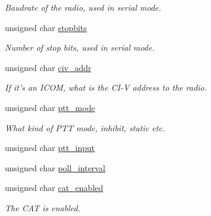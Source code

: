 \begin{CompactItemize}
\begin{CompactList}\small\item\em Baudrate of the radio, used in serial mode. \item\end{CompactList}\item 
\hypertarget{structstruct__radio__settings_5d4d1cea2c84848f17837787af04a467}{
unsigned char \hyperlink{structstruct__radio__settings_5d4d1cea2c84848f17837787af04a467}{stopbits}}
\label{structstruct__radio__settings_5d4d1cea2c84848f17837787af04a467}

\begin{CompactList}\small\item\em Number of stop bits, used in serial mode. \item\end{CompactList}\item 
\hypertarget{structstruct__radio__settings_81ba35ad633d14c9faf5413beb8cd958}{
unsigned char \hyperlink{structstruct__radio__settings_81ba35ad633d14c9faf5413beb8cd958}{civ\_\-addr}}
\label{structstruct__radio__settings_81ba35ad633d14c9faf5413beb8cd958}

\begin{CompactList}\small\item\em If it's an ICOM, what is the CI-V address to the radio. \item\end{CompactList}\item 
\hypertarget{structstruct__radio__settings_155234bbcff301f6741178b633045516}{
unsigned char \hyperlink{structstruct__radio__settings_155234bbcff301f6741178b633045516}{ptt\_\-mode}}
\label{structstruct__radio__settings_155234bbcff301f6741178b633045516}

\begin{CompactList}\small\item\em What kind of PTT mode, inhibit, static etc. \item\end{CompactList}\item 
unsigned char \hyperlink{structstruct__radio__settings_c8717f0e816966ebd671e937274e28bd}{ptt\_\-input}
\item 
unsigned char \hyperlink{structstruct__radio__settings_cc56ddea194970d32f97fa81e99dc1f4}{poll\_\-interval}
\item 
\hypertarget{structstruct__radio__settings_6eedc0f426bb6692c9f6d4a9c616a495}{
unsigned char \hyperlink{structstruct__radio__settings_6eedc0f426bb6692c9f6d4a9c616a495}{cat\_\-enabled}}
\label{structstruct__radio__settings_6eedc0f426bb6692c9f6d4a9c616a495}

\begin{CompactList}\small\item\em The CAT is enabled. \item\end{CompactList}\end{CompactItemize}


